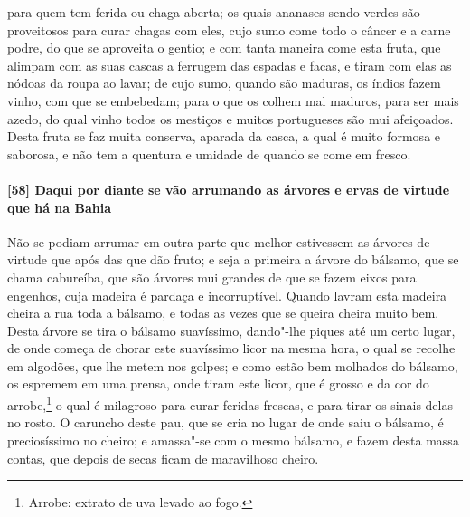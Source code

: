\begin{linenumbers}
para quem tem ferida ou chaga aberta; os quais ananases sendo verdes são proveitosos para
curar chagas com eles, cujo sumo come todo o câncer e a carne podre, do que se aproveita o
gentio; e com tanta maneira come esta fruta, que alimpam com as suas cascas a ferrugem das
espadas e facas, e tiram com elas as nódoas da roupa ao lavar; de cujo sumo, quando são
maduras, os índios fazem vinho, com que se embebedam; para o que os colhem mal maduros,
para ser mais azedo, do qual vinho todos os mestiços e muitos portugueses são mui
afeiçoados. Desta fruta se faz muita conserva, aparada da casca, a qual é muito formosa e
saborosa, e não tem a quentura e umidade de quando se come em fresco.

\paragraph{[58] Daqui por diante se vão arrumando as árvores e ervas de virtude que há na
Bahia}\quad
Não se podiam arrumar em outra parte que melhor estivessem as árvores de virtude que após
das que dão fruto; e seja a primeira a árvore do bálsamo, que se chama cabureíba, que são
árvores mui grandes de que se fazem eixos para engenhos, cuja madeira é pardaça e
incorruptível. Quando lavram esta madeira cheira a rua toda a bálsamo, e todas as vezes
que se queira cheira muito bem. Desta árvore se tira o bálsamo suavíssimo, dando"-lhe
piques até um certo lugar, de onde começa de chorar este suavíssimo licor na mesma hora, o
qual se recolhe em algodões, que lhe metem nos golpes; e como estão bem molhados do
bálsamo, os espremem em uma prensa, onde tiram este licor, que é grosso e da cor do
arrobe,\footnote{ Arrobe: extrato de uva levado ao fogo.} o qual é milagroso para curar
feridas frescas, e para tirar os sinais delas no rosto. O caruncho deste pau, que se cria
no lugar de onde saiu o bálsamo, é preciosíssimo no cheiro; e amassa"-se com o mesmo
bálsamo, e fazem desta massa contas, que depois de secas ficam de maravilhoso cheiro.


\end{linenumbers}
